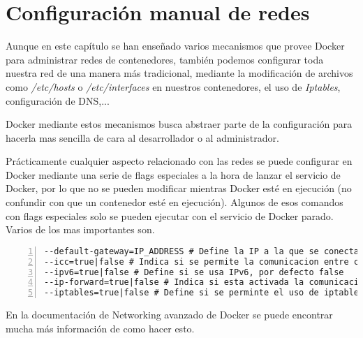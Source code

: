 	
	\section{Configuración manual de redes}
	Aunque en este capítulo se han enseñado varios mecanismos que provee Docker para administrar redes de contenedores, también podemos configurar toda nuestra red de una manera más tradicional, mediante la modificación de archivos como \emph{/etc/hosts} o \emph{/etc/interfaces} en nuestros contenedores, el uso de \emph{Iptables}, configuración de DNS,... 
	
	Docker mediante estos mecanismos busca abstraer parte de la configuración para hacerla mas sencilla de cara al desarrollador o al administrador.
	
	Prácticamente cualquier aspecto relacionado con las redes se puede configurar en Docker mediante una serie de flags especiales a la hora de lanzar el servicio de Docker, por lo que no se pueden modificar mientras Docker esté en ejecución (no confundir con que un contenedor esté en ejecución). Algunos de esos comandos con flags especiales solo se pueden ejecutar con el servicio de Docker parado. Varios de los mas importantes son.
	
	\begin{lstlisting}[style=consola,numbers=left]
--default-gateway=IP_ADDRESS # Define la IP a la que se conectaran los contenedores de Docker al crearse, por defecto se usa la de docker0
--icc=true|false # Indica si se permite la comunicacion entre contenedores, por defecto true
--ipv6=true|false # Define si se usa IPv6, por defecto false
--ip-forward=true|false # Indica si esta activada la comunicacion entre los contenedores y el exterior, por defecto true
--iptables=true|false # Define si se perminte el uso de iptables (filtra direcciones y puertos, se usa como firewall en sistemas tipo UNIX)
	\end{lstlisting}
	
	En la documentación de Networking avanzado de Docker \cite{docker-network-advanced} se puede encontrar mucha más información de como hacer esto.
	